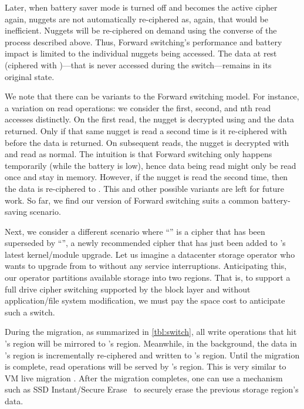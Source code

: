 Later, when battery saver mode is turned off and \cone becomes the active cipher
again, nuggets are not automatically re-ciphered as, again, that would be
inefficient. Nuggets will be re-ciphered on demand using the converse of the
process described above. Thus, Forward switching's performance and battery
impact is limited to the individual nuggets being accessed.  The data at rest
(ciphered with \cone)---that is never accessed during the switch---remains in
its original state.

We note that there can be variants to the Forward switching model. For instance,
a variation on read operations: we consider the first, second, and nth read
accesses distinctly. On the first read, the nugget is decrypted using \cone and
the data returned. Only if that same nugget is read a second time is it
re-ciphered with \ctwo before the data is returned. On subsequent reads, the
nugget is decrypted with \ctwo and read as normal. The intuition is that Forward
switching only happens temporarily (\eg while the battery is low), hence data
being read might only be read once and stay in memory. However, if the nugget is
read the second time, then the data is re-ciphered to \ctwo. This and other
possible variants are left for future work. So far, we find our version of
Forward switching suits a common battery-saving scenario.



 Next, we consider a different scenario where
``\cone'' is a cipher that has been superseded by ``\ctwo'', a newly recommended
cipher that has just been added to \sys's latest kernel/module upgrade. Let us
imagine a datacenter storage operator who wants to upgrade from \cone to \ctwo
without any service interruptions. Anticipating this, our operator partitions
available storage into two regions. That is, to support a full drive cipher
switching supported by the block layer and without application/file system
modification, we must pay the space cost to anticipate such a switch.

During the migration, as summarized in \cref{tbl:switch}, all write operations
that hit \cone's region will be mirrored to \ctwo's region. Meanwhile, in the
background, the data in \cone's region is incrementally re-ciphered and written
to \ctwo's region. Until the migration is complete, read operations will be
served by \cone's region. This is very similar to VM live migration
\cite{live-vm-migration}. After the migration completes, one can use a mechanism
such as SSD Instant/Secure Erase~\cite{ISE1,ISE2,ISE3} to securely erase the
previous storage region's data.

